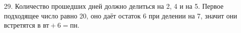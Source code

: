 29. Количество прошедших дней должно делиться на 2, 4 и на 5. Первое подходящее число равно 20, оно даёт остаток 6 при делении на 7, значит они встретятся в $\text{вт}+6=\text{пн}$.\\
